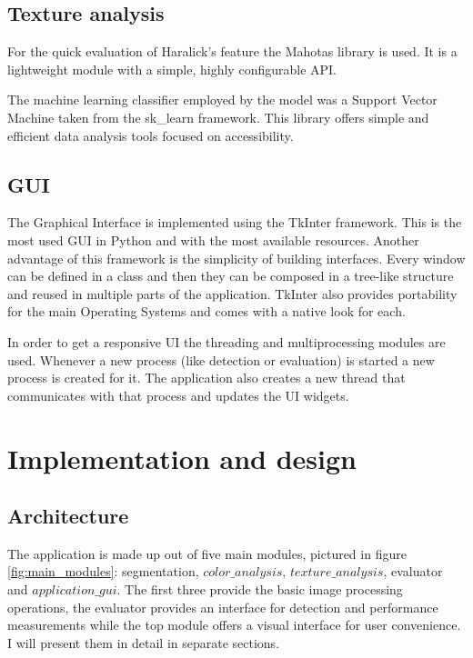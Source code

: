 \documentclass[12pt]{report}
\begin{document}
	\subsection{Texture analysis}
	For the quick evaluation of Haralick's feature the Mahotas\cite{mahotas} library is used. It is a lightweight module with a simple, highly configurable API. 
	
	The machine learning classifier employed by the model was a Support Vector Machine taken from the sk\_learn framework\cite{sklearn}. This library offers simple and efficient data analysis tools focused on accessibility.
	
	\subsection{GUI}
	The Graphical Interface is implemented using the TkInter framework\cite{tkinter}. This is the most used GUI in Python and with the most available resources. Another advantage of this framework is the simplicity of building interfaces. Every window can be defined in a class and then they can be composed in a tree-like structure and reused in multiple parts of the application. TkInter also provides portability for the main Operating Systems and comes with a native look for each.
	
	In order to get a responsive UI the threading and multiprocessing modules are used. Whenever a new process (like detection or evaluation) is started a new process is created for it. The application also creates a new thread that communicates with that process and updates the UI widgets.
	
	\section{Implementation and design}
	
	\subsection{Architecture}
	
	The application is made up out of five main modules, pictured in figure \ref{fig:main_modules}: segmentation, $color\_analysis$, $texture\_analysis$, evaluator and $application\_gui$. The first three provide the basic image processing operations, the evaluator provides an interface for detection and performance measurements while the top module offers a visual interface for user convenience. I will present them in detail in separate sections.
	
\end{document}
